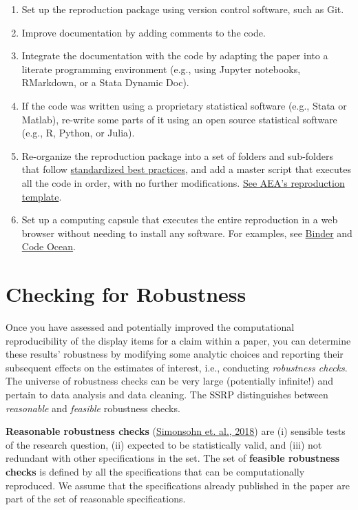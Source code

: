\documentclass[
]{book}
\providecommand{\tightlist}{%
  \setlength{\itemsep}{0pt}\setlength{\parskip}{0pt}}
\begin{document}
\begin{enumerate}
\def\labelenumi{\arabic{enumi}.}
\tightlist
\item
  Set up the reproduction package using version control software, such as Git.
\item
  Improve documentation by adding comments to the code.
\item
  Integrate the documentation with the code by adapting the paper into a literate programming environment (e.g., using Jupyter notebooks, RMarkdown, or a Stata Dynamic Doc).
\item
  If the code was written using a proprietary statistical software (e.g., Stata or Matlab), re-write some parts of it using an open source statistical software (e.g., R, Python, or Julia).
\item
  Re-organize the reproduction package into a set of folders and sub-folders that follow \href{https://www.projecttier.org/tier-protocol/specifications/\#overview-of-the-documentation}{standardized best practices}, and add a master script that executes all the code in order, with no further modifications. \href{https://github.com/AEADataEditor/replication-template}{See AEA's reproduction template}.\\
\item
  Set up a computing capsule that executes the entire reproduction in a web browser without needing to install any software. For examples, see \href{https://mybinder.org/}{Binder} and \href{https://codeocean.com/}{Code Ocean}.
\end{enumerate}

\hypertarget{robust}{%
\chapter{Checking for Robustness}\label{robust}}

Once you have assessed and potentially improved the computational reproducibility of the display items for a claim within a paper, you can determine these results' robustness by modifying some analytic choices and reporting their subsequent effects on the estimates of interest, i.e., conducting \emph{robustness checks}. The universe of robustness checks can be very large (potentially infinite!) and pertain to data analysis and data cleaning. The SSRP distinguishes between \emph{reasonable} and \emph{feasible} robustness checks.

\textbf{Reasonable robustness checks} (\href{https://urisohn.com/sohn_files/wp/wordpress/wp-content/uploads/Paper-Specification-curve-2018-11-02.pdf}{Simonsohn et. al., 2018}) are (i) sensible tests of the research question, (ii) expected to be statistically valid, and (iii) not redundant with other specifications in the set. The set of \textbf{feasible robustness checks} is defined by all the specifications that can be computationally reproduced. We assume that the specifications already published in the paper are part of the set of reasonable specifications.
\end{document}
